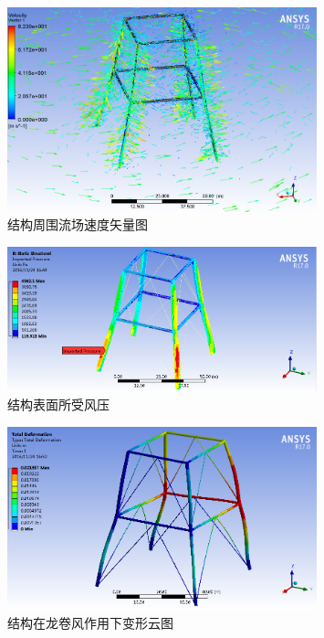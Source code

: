 \documentclass{ctexart}
\begin{document}
\begin{figure}[!htpb]
  \centering
  \includegraphics[width=0.8\textwidth]{velocity.png}
  \caption{结构周围流场速度矢量图}
  \label{fig:velocity}
\end{figure}

\begin{figure}[!htpb]
  \centering
  \includegraphics[width=0.8\textwidth]{pressure.png}
  \caption{结构表面所受风压}
  \label{fig:pressure}
\end{figure}

\begin{figure}[!htpb]
  \centering
  \includegraphics[width=0.8\textwidth]{disp.png}
  \caption{结构在龙卷风作用下变形云图}
  \label{fig:disp}
\end{figure}

\newpage


\end{document}
